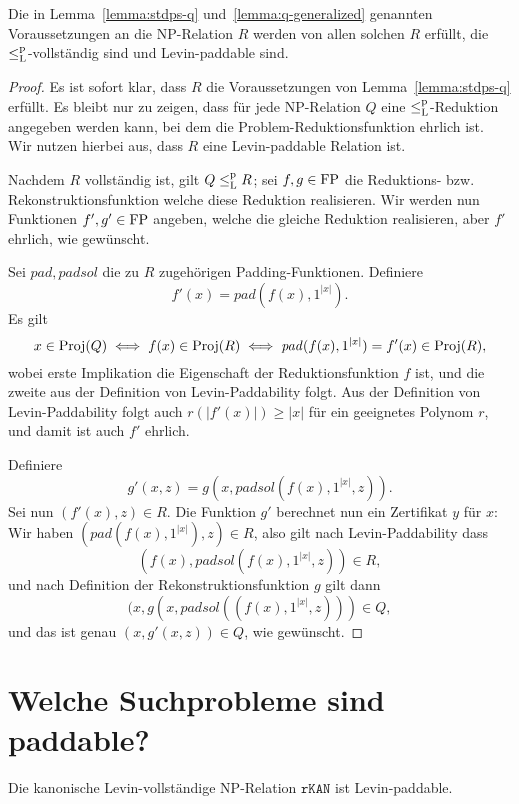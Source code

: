 \begin{lemma}
    Die in Lemma~\ref{lemma:stdps-q} und~\ref{lemma:q-generalized} genannten Voraussetzungen an die NP-Relation $R$ werden von allen solchen $R$ erfüllt, die $\leq_\mathrm{L}^\mathrm{p}$-vollständig sind und Levin-paddable sind.
\end{lemma}
\begin{proof}
    Es ist sofort klar, dass $R$ die Voraussetzungen von Lemma~\ref{lemma:stdps-q} erfüllt.
    Es bleibt nur zu zeigen, dass für jede NP-Relation $Q$ eine $\leq_\mathrm{L}^\mathrm{p}$-Reduktion angegeben werden kann, bei dem die Problem-Reduktionsfunktion ehrlich ist.
    Wir nutzen hierbei aus, dass $R$ eine Levin-paddable Relation ist.

    Nachdem $R$ vollständig ist, gilt $Q\leq_\mathrm{L}^\mathrm{p} R$; sei $f,g\in\mathrm{FP}$ die Reduktions- bzw. Rekonstruktionsfunktion welche diese Reduktion realisieren. Wir werden nun Funktionen $f', g'\in\mathrm{FP}$ angeben, welche die gleiche Reduktion realisieren, aber $f'$ ehrlich, wie gewünscht.

    Sei $\mathit{pad}, \mathit{padsol}$ die zu $R$ zugehörigen Padding-Funktionen. Definiere
    \[ f'(x) = \mathit{pad}(f(x), 1^{|x|}). \]
    Es gilt
    \[ x\in\operatorname{Proj}(Q) \iff f(x)\in \operatorname{Proj}(R) \iff \mathit{pad}(f(x), 1^{|x|})=f'(x)\in\operatorname{Proj}(R), \]
    wobei erste Implikation die Eigenschaft der Reduktionsfunktion $f$ ist, und die zweite aus der Definition von Levin-Paddability folgt.
    Aus der Definition von  Levin-Paddability folgt auch $r(|f'(x)|)\geq |x|$ für ein geeignetes Polynom $r$, und damit ist auch $f'$ ehrlich.

    Definiere
    \[ g'(x, z) = g(x, \mathit{padsol}(f(x), 1^{|x|}, z)). \]
    Sei nun $(f'(x), z)\in R$. Die Funktion $g'$ berechnet nun ein Zertifikat $y$ für $x$: Wir haben $(\mathit{pad}(f(x), 1^{|x|}), z)\in R$, also gilt nach Levin-Paddability dass \[(f(x), \mathit{padsol}(f(x), 1^{|x|}, z))\in R,\] 
    und nach Definition der Rekonstruktionsfunktion $g$ gilt dann
    \[(x, g(x, \mathit{padsol}((f(x), 1^{|x|}, z)))\in Q,\]
    und das ist genau $(x, g'(x, z))\in Q$, wie gewünscht.
\end{proof}

\section{Welche Suchprobleme sind paddable?}

\begin{observation}\label{obs:rkan-paddable}
    Die kanonische Levin-vollständige NP-Relation $\mathtt{rKAN}$ ist Levin-paddable.
\end{observation}

